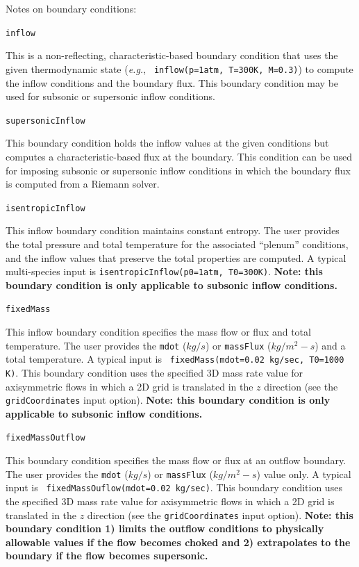 \documentclass{article}
\begin{document}
  Notes on boundary conditions:

  \begin{list}{}{}

    
  \item {\tt inflow}

    This is a non-reflecting, characteristic-based boundary condition
    that uses the given thermodynamic state ({\it{e.g.}}, {\tt
      inflow(p=1atm, T=300K, M=0.3)}) to
    compute the inflow conditions and the boundary flux.  This
    boundary condition may be used for subsonic or supersonic inflow
    conditions.
    
  \item {\tt supersonicInflow}

    This boundary condition holds the inflow values at the given
    conditions but computes a characteristic-based flux at the
    boundary.  This condition can be used for imposing subsonic or
    supersonic inflow conditions in which the boundary flux is
    computed from a Riemann solver.

  \item {\tt isentropicInflow}

    This inflow boundary condition maintains constant entropy.  The
    user provides the total pressure and total temperature for the
    associated ``plenum'' conditions, and the inflow values that
    preserve the total properties are computed.  A typical
    multi-species input is {\tt isentropicInflow(p0=1atm, T0=300K)}.
    {\bf Note: this boundary condition is only applicable to subsonic
      inflow conditions.}

  \item {\tt fixedMass}

    This inflow boundary condition specifies the mass flow or flux
    and total temperature.  The user provides the
    {\tt mdot} ($kg/s$) or {\tt massFlux} ($kg/m^2-s$) and
    a total temperature.  A typical input is {\tt
    fixedMass(mdot=0.02 kg/sec, T0=1000 K)}.  This boundary condition
    uses the specified 3D mass rate value for axisymmetric flows in which a 2D grid
    is translated in the $z$ direction (see the {\tt gridCoordinates} input option).  {\bf Note:
    this boundary condition is only applicable to subsonic inflow conditions.}

  \item {\tt fixedMassOutflow}

    This boundary condition specifies the mass flow or flux
    at an outflow boundary.  The user provides the
    {\tt mdot} ($kg/s$) or {\tt massFlux} ($kg/m^2-s$) value only.  A typical input is {\tt
    fixedMassOuflow(mdot=0.02 kg/sec)}.  This boundary condition
    uses the specified 3D mass rate value for axisymmetric flows in which a 2D grid
    is translated in the $z$ direction (see the {\tt gridCoordinates} input option).  {\bf Note:
    this boundary condition 1) limits the outflow conditions to physically allowable values if the flow
    becomes choked and 2) extrapolates to the boundary if the flow becomes supersonic.}


\end{list}
\end{document}
